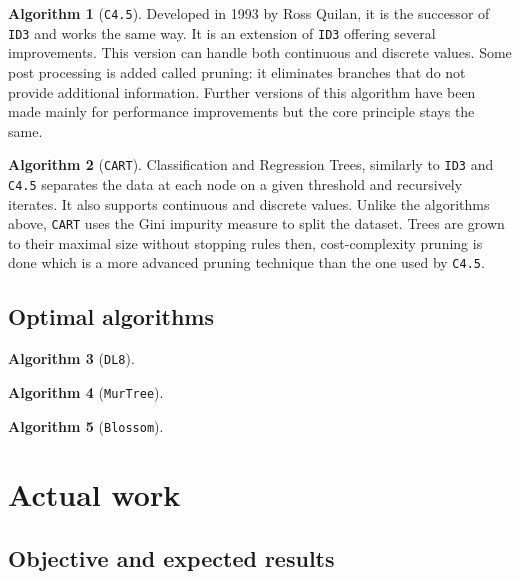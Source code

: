 \documentclass[12pt]{report}
\theoremstyle{definition}
\theoremstyle{definition}
\newtheorem*{algo}{Algorithm}
\theoremstyle{definition}
\begin{document}
\begin{algo}[\texttt{C4.5}]
    Developed in 1993 by Ross Quilan, it is the successor of \texttt{ID3} and works the same way. It is an extension
    of \texttt{ID3} offering several improvements. This version can handle both continuous and discrete values.
    Some post processing is added called pruning: it eliminates branches that do not provide additional
    information. Further versions of this algorithm have been made mainly for performance improvements but
    the core principle stays the same.
\end{algo}

\begin{algo}[\texttt{CART}]
    Classification and Regression Trees, similarly to \texttt{ID3} and \texttt{C4.5} separates the data at each node
    on a given threshold and recursively iterates. It also supports continuous and discrete values. Unlike the algorithms
    above, \texttt{CART} uses the Gini impurity measure to split the dataset. Trees are grown to their maximal size
    without stopping rules then, cost-complexity pruning is done which is a more advanced pruning technique
    than the one used by \texttt{C4.5}.
\end{algo}


\section{Optimal algorithms}
\begin{algo}[\texttt{DL8}]
\end {algo}

\begin{algo}[\texttt{MurTree}]
\end {algo}

\begin{algo}[\texttt{Blossom}]
\end {algo}



\chapter{Actual work}
\section{Objective and expected results} %
\end{document}
